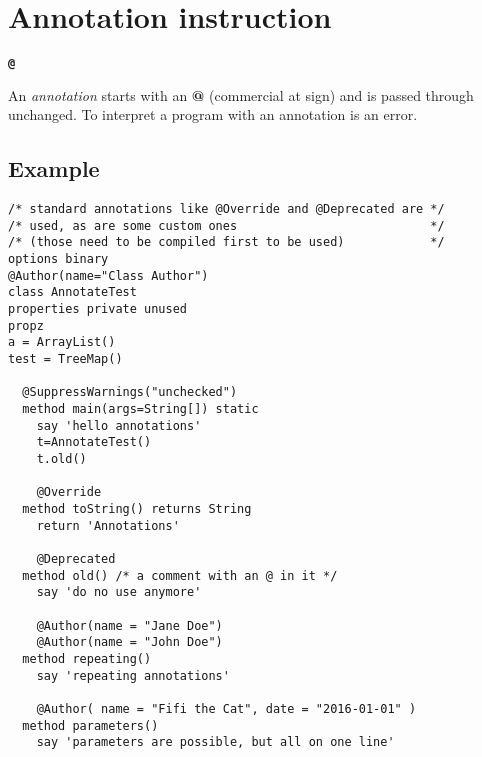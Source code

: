 \chapter{Annotation instruction}\label{refparse}
\begin{shaded}
\begin{alltt}
\textbf{@}
\end{alltt}
\end{shaded}
An \emph{annotation} starts with an \textbf{@} (commercial at sign)
and is passed through unchanged. To interpret a program with an annotation is an error.
\section{Example}
\begin{lstlisting}
/* standard annotations like @Override and @Deprecated are */
/* used, as are some custom ones                           */
/* (those need to be compiled first to be used)            */
options binary
@Author(name="Class Author")
class AnnotateTest
properties private unused
propz
a = ArrayList()
test = TreeMap()

  @SuppressWarnings("unchecked")
  method main(args=String[]) static
    say 'hello annotations'
    t=AnnotateTest()
    t.old()

    @Override
  method toString() returns String
    return 'Annotations'

    @Deprecated
  method old() /* a comment with an @ in it */
    say 'do no use anymore'

    @Author(name = "Jane Doe")
    @Author(name = "John Doe")
  method repeating()
    say 'repeating annotations'

    @Author( name = "Fifi the Cat", date = "2016-01-01" )
  method parameters()
    say 'parameters are possible, but all on one line'
\end{lstlisting}